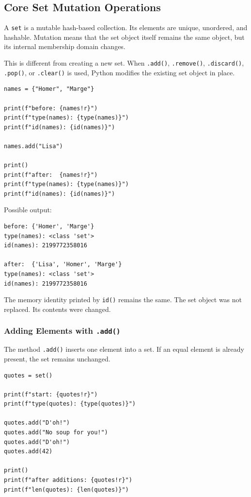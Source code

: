 \subsection{Core Set Mutation Operations}

A \texttt{set} is a mutable hash-based collection. Its elements are unique, unordered, and hashable. Mutation means that the set object itself remains the same object, but its internal membership domain changes.

This is different from creating a new set. When \texttt{.add()}, \texttt{.remove()}, \texttt{.discard()}, \texttt{.pop()}, or \texttt{.clear()} is used, Python modifies the existing set object in place.

\begin{verbatim}
names = {"Homer", "Marge"}

print(f"before: {names!r}")
print(f"type(names): {type(names)}")
print(f"id(names): {id(names)}")

names.add("Lisa")

print()
print(f"after:  {names!r}")
print(f"type(names): {type(names)}")
print(f"id(names): {id(names)}")
\end{verbatim}

Possible output:

\begin{verbatim}
before: {'Homer', 'Marge'}
type(names): <class 'set'>
id(names): 2199772358016

after:  {'Lisa', 'Homer', 'Marge'}
type(names): <class 'set'>
id(names): 2199772358016
\end{verbatim}

The memory identity printed by \texttt{id()} remains the same. The set object was not replaced. Its contents were changed.

\subsubsection{Adding Elements with \texttt{.add()}}

The method \texttt{.add()} inserts one element into a set. If an equal element is already present, the set remains unchanged.

\begin{verbatim}
quotes = set()

print(f"start: {quotes!r}")
print(f"type(quotes): {type(quotes)}")

quotes.add("D'oh!")
quotes.add("No soup for you!")
quotes.add("D'oh!")
quotes.add(42)

print()
print(f"after additions: {quotes!r}")
print(f"len(quotes): {len(quotes)}")
\end{verbatim}

